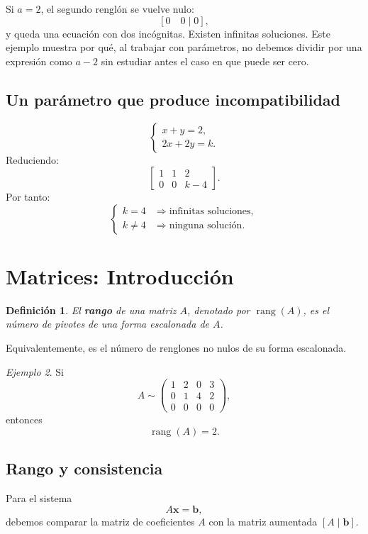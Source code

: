 \documentclass[12pt]{article}
\newtheorem{definicion}{Definición}[section]
\theoremstyle{remark}
\newtheorem{ejemplo}[definicion]{Ejemplo}
\newcommand{\rank}{\operatorname{rang}}
\begin{document}
Si $a=2$, el segundo renglón se vuelve nulo:
\[
[0\quad0\mid0],
\]
y queda una ecuación con dos incógnitas. Existen infinitas soluciones. Este ejemplo muestra por qué, al trabajar con parámetros, no debemos dividir por una expresión como $a-2$ sin estudiar antes el caso en que puede ser cero.
\subsection*{Un parámetro que produce incompatibilidad}
\[
\begin{cases}
x+y=2,\\
2x+2y=k.
\end{cases}
\]
Reduciendo:
\[
\left[
\begin{array}{cc|c}
1&1&2\\
0&0&k-4
\end{array}
\right].
\]
Por tanto:
\[
\begin{cases}
k=4 &\Longrightarrow \text{infinitas soluciones},\\
k\neq4 &\Longrightarrow \text{ninguna solución}.
\end{cases}
\]
\section{Matrices: Introducci\'on}
\begin{definicion}
El \textbf{rango} de una matriz $A$, denotado por $\rank(A)$, es el número de pivotes de una forma escalonada de $A$.
\end{definicion}

Equivalentemente, es el número de renglones no nulos de su forma escalonada.

\begin{ejemplo}
Si
\[
A\sim
\begin{pmatrix}
1&2&0&3\\
0&1&4&2\\
0&0&0&0
\end{pmatrix},
\]
entonces
\[
\rank(A)=2.
\]
\end{ejemplo}
\subsection*{Rango y consistencia}
Para el sistema
\[
A\mathbf{x}=\mathbf b,
\]
debemos comparar la matriz de coeficientes $A$ con la matriz aumentada $[A\mid\mathbf b]$.
\end{document}
